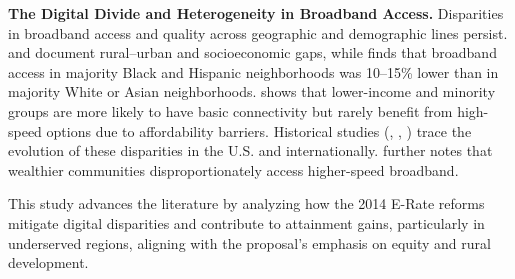 \textbf{The Digital Divide and Heterogeneity in Broadband Access.}  Disparities in broadband access and quality across geographic and demographic lines persist. \citet{gallardo2022} and \citet{gallardo2024} document rural–urban and socioeconomic gaps, while \citet{li2023} finds that broadband access in majority Black and Hispanic neighborhoods was 10–15\% lower than in majority White or Asian neighborhoods. \citet{reddick2020} shows that lower-income and minority groups are more likely to have basic connectivity but rarely benefit from high-speed options due to affordability barriers. Historical studies (\citet{strover2001}, \citet{riddlesden2014},  \citet{kelley2020}) trace the evolution of these disparities in the U.S. and internationally. \citet{boeri2023} further notes that wealthier communities disproportionately access higher-speed broadband. 

This study advances the literature by analyzing how the 2014 E-Rate reforms mitigate digital disparities and contribute to attainment gains, particularly in underserved regions, aligning with the proposal’s emphasis on equity and rural development.









